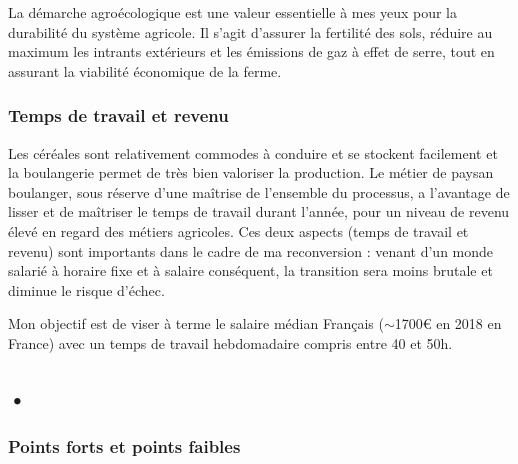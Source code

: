 \documentclass{article}
\begin{document}
La démarche agroécologique est une valeur essentielle à mes yeux pour la durabilité du système agricole. Il s'agit d'assurer la fertilité des sols, réduire au maximum les intrants extérieurs et les émissions de gaz à effet de serre, tout en assurant la viabilité économique de la ferme. 

\subsubsection*{Temps de travail et revenu}

Les céréales sont relativement commodes à conduire et se stockent facilement et la boulangerie permet de très bien valoriser la production. Le métier de paysan boulanger, sous réserve d'une maîtrise de l'ensemble du processus, a l'avantage de lisser et de maîtriser le temps de travail durant l'année, pour un niveau de revenu élevé en regard des métiers agricoles. Ces deux aspects (temps de travail et revenu) sont importants dans le cadre de ma reconversion : venant d'un monde salarié à horaire fixe et à salaire conséquent, la transition sera moins brutale et diminue le risque d'échec. 

Mon objectif est de viser à terme le salaire médian Français ($\sim$1700\euro{} en 2018 en France) avec un temps de travail hebdomadaire compris entre 40 et 50h.

\subsection{•}

\subsubsection*{Points forts et points faibles}
\end{document}
